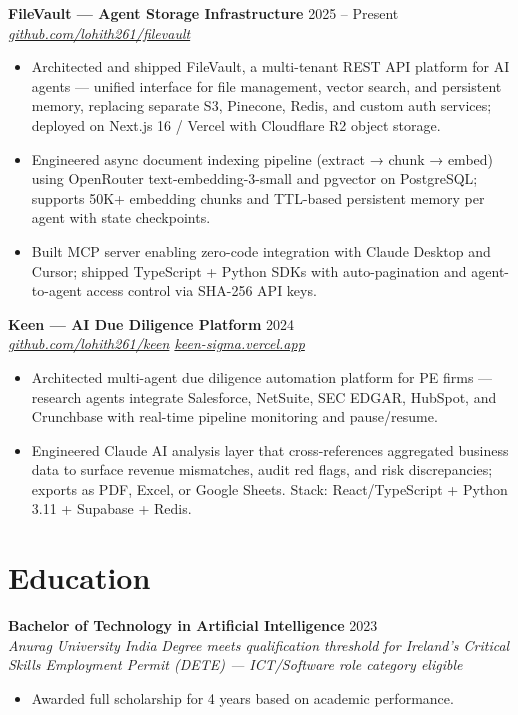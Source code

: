 \documentclass[10pt,letterpaper]{article}
\newcommand{\entry}[3]{%
  \vspace{3pt}\textbf{#1} \hfill #3 \\
  \textit{\small #2}\vspace{1pt}}
\begin{document}
\entry{FileVault --- Agent Storage Infrastructure}{\href{https://github.com/lohith261/filevault}{github.com/lohith261/filevault}}{2025 -- Present}
\begin{itemize}
  \item Architected and shipped FileVault, a multi-tenant REST API platform for AI agents --- unified interface for file management, vector search, and persistent memory, replacing separate S3, Pinecone, Redis, and custom auth services; deployed on Next.js 16 / Vercel with Cloudflare R2 object storage.
  \item Engineered async document indexing pipeline (extract → chunk → embed) using OpenRouter text-embedding-3-small and pgvector on PostgreSQL; supports 50K+ embedding chunks and TTL-based persistent memory per agent with state checkpoints.
  \item Built MCP server enabling zero-code integration with Claude Desktop and Cursor; shipped TypeScript + Python SDKs with auto-pagination and agent-to-agent access control via SHA-256 API keys.
\end{itemize}

\entry{Keen --- AI Due Diligence Platform}{\href{https://github.com/lohith261/keen}{github.com/lohith261/keen} \quad\textbullet\quad \href{https://keen-sigma.vercel.app/}{keen-sigma.vercel.app}}{2024}
\begin{itemize}
  \item Architected multi-agent due diligence automation platform for PE firms --- research agents integrate Salesforce, NetSuite, SEC EDGAR, HubSpot, and Crunchbase with real-time pipeline monitoring and pause/resume.
  \item Engineered Claude AI analysis layer that cross-references aggregated business data to surface revenue mismatches, audit red flags, and risk discrepancies; exports as PDF, Excel, or Google Sheets. Stack: React/TypeScript + Python 3.11 + Supabase + Redis.
\end{itemize}

\section{Education}

\entry{Bachelor of Technology in Artificial Intelligence}{Anurag University \textbullet{} India}{2023}
\newline\textit{\small Degree meets qualification threshold for Ireland's Critical Skills Employment Permit (DETE) --- ICT/Software role category eligible}
\begin{itemize}
  \item Awarded full scholarship for 4 years based on academic performance.
\end{itemize}
\end{document}
